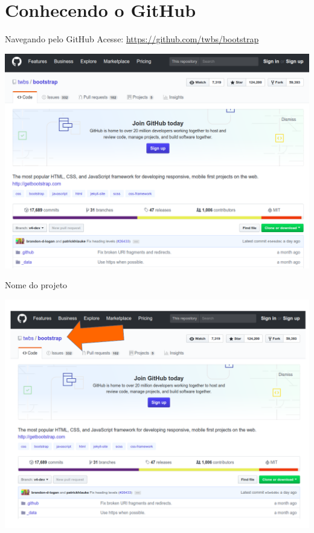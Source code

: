 \documentclass{beamer}
\begin{document}
\section{Conhecendo o GitHub}
\begin{frame}{Navegando pelo GitHub}
  Acesse: 
  \href{https://github.com/twbs/bootstrap}{https://github.com/twbs/bootstrap}
  \begin{center}
       \includegraphics[height=0.7\paperheight]{fig/aula3/print_github_1.png} \\
      \end{center}
 
\end{frame}
\begin{frame}{Nome do projeto}
  \begin{center}
       \includegraphics[height=0.7\paperheight]{fig/aula3/nome_projeto.png} \\
      \end{center}
 
\end{frame}
\end{document}
